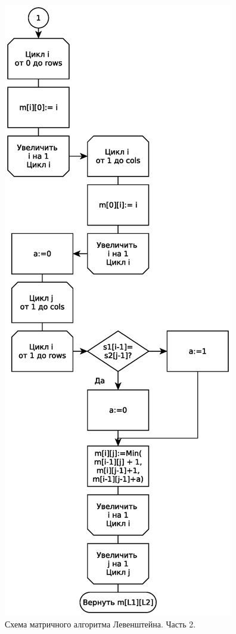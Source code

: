\begin{figure}
    \centering
    \includegraphics[height=0.9\textheight]{schemes/levenshtein-iterative-eps-2}
    \caption{Схема матричного алгоритма Левенштейна. Часть 2.}
    \label{levenshtein-iterative-scheme-part-2}
\end{figure}

